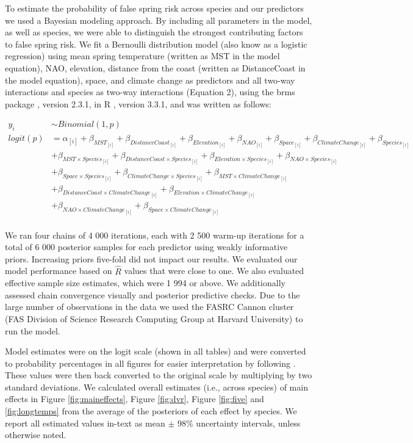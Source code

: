 \documentclass{article}\usepackage[]{graphicx}\usepackage[]{color}
\begin{document}
To estimate the probability of false spring risk across species and our predictors we used a Bayesian modeling approach. By including all parameters in the model, as well as species, we were able to distinguish the strongest contributing factors to false spring risk. We fit a Bernoulli distribution model (also know as a logistic regression) using mean spring temperature (written as MST in the model equation), NAO, elevation, distance from the coast (written as DistanceCoast in the model equation), space, and climate change as predictors and all two-way interactions and species as two-way interactions (Equation 2), using the brms package \citep{brms}, version 2.3.1, in R \citep{R}, version 3.3.1, and was written as follows:

\begin{align*}
 y_i & \sim Binomial(1,p) \tag{2} \\
logit(p) &= \alpha_{[i]} + \beta_{MST_{[i]}} + \beta_{DistanceCoast_{[i]}} + \beta_{Elevation_{[i]}} + \beta_{NAO_{[i]}} + \beta_{Space_{[i]}} + \beta_{ClimateChange_{[i]}} + \beta_{Species_{[i]}} \\ 
  &+ \beta_{MST \times Species_{[i]}} + \beta_{DistanceCoast \times Species_{[i]}} + \beta_{Elevation \times Species_{[i]}} + \beta_{NAO \times Species_{[i]}}\\
  &+ \beta_{Space \times Species_{[i]}} + \beta_{ClimateChange \times Species_{[i]}} + \beta_{MST \times ClimateChange_{[i]}}\\ 
  &+ \beta_{DistanceCoast \times ClimateChange_{[i]}} + \beta_{Elevation \times ClimateChange_{[i]}}\\ 
  &+ \beta_{NAO \times ClimateChange_{[i]}} + \beta_{Space \times ClimateChange_{[i]}} \nonumber\\
\end{align*}

We ran four chains of 4 000 iterations, each with 2 500 warm-up iterations for a total of 6 000 posterior samples for each predictor using weakly informative priors. Increasing priors five-fold did not impact our results. We evaluated our model performance based on $\hat{R}$ values that were close to one. We also evaluated effective sample size estimates, which were 1 994 or above. We additionally assessed chain convergence visually and posterior predictive checks. Due to the large number of observations in the data we used the FASRC Cannon cluster (FAS Division of Science Research Computing Group at Harvard University) to run the model. 

Model estimates were on the logit scale (shown in all tables) and were converted to probability percentages in all figures for easier interpretation by following \citep{Gelman2006}. These values were then back converted to the original scale by multiplying by two standard deviations. We calculated overall estimates (i.e., across species) of main effects in Figure \ref{fig:maineffects}, Figure \ref{fig:dvr}, Figure \ref{fig:five} and \ref{fig:longtemps} from the average of the posteriors of each effect by species. We report all estimated values in-text as mean $\pm$ 98\% uncertainty intervals, unless otherwise noted. 
\end{document}
